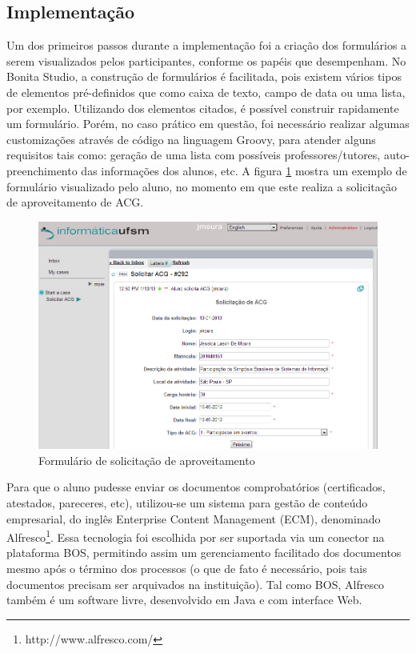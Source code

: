 \documentclass[12pt]{article}
\begin{document}
\subsection{Implementação}


Um dos primeiros passos durante a implementação foi a criação dos formulários a serem visualizados pelos participantes, conforme os papéis que desempenham. No Bonita Studio, a construção de formulários é facilitada, pois existem vários tipos de elementos pré-definidos que como caixa de texto, campo de data ou uma lista, por exemplo. Utilizando dos elementos citados, é possível construir rapidamente um formulário. Porém, no caso prático em questão, foi necessário realizar algumas customizações através de código na linguagem Groovy, para atender alguns requisitos tais como: geração de uma lista com possíveis professores/tutores, auto-preenchimento das informações dos alunos, etc. A figura \ref{fig:form}  mostra um exemplo de formulário visualizado pelo aluno, no momento em que este realiza a solicitação de aproveitamento de ACG.

\begin{figure}[ht]
\centering
\includegraphics[width=.9\textwidth]{images/formSolicitacao.png}
\caption{Formulário de solicitação de aproveitamento}
\label{fig:form}
\end{figure}

Para que o aluno pudesse enviar os documentos comprobatórios (certificados, atestados, pareceres, etc), utilizou-se um sistema para gestão de conteúdo empresarial, do inglês Enterprise Content Management (ECM), denominado Alfresco\footnote{http://www.alfresco.com/}. Essa tecnologia foi escolhida por ser suportada via um conector na plataforma BOS, permitindo assim um gerenciamento facilitado dos documentos mesmo após o término dos processos (o que de fato é necessário, pois tais documentos precisam ser arquivados na instituição). Tal como BOS, Alfresco também é um software livre, desenvolvido em Java e com interface Web.
\end{document}
